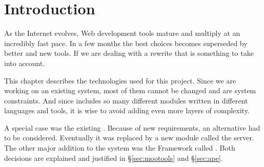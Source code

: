 \section{Introduction} %
\label{sec:intro2}

As the Internet evolves, Web development tools mature and multiply at an incredibly fast pace.
In a few months the best choices becomes superseded by better and new tools.
If we are dealing with a rewrite that is something to take into account.

This chapter describes the technologies used for this project.
Since we are working on an existing system, most of them cannot be changed and are system constraints.
And since  includes so many different modules written in different languages and tools, it is wise to avoid adding even more layers of complexity.

A special case was the existing .
Because of new requirements, an alternative had to be considered.
Eventually it was replaced by a new module called the  server.
The other major addition to the system was the  Framework called .
Both decisions are explained and justified in \S\vref{sec:mootools} and  \S\vref{sec:ape}.

